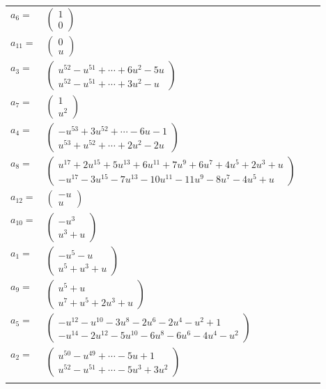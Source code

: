 \documentclass[1p]{elsarticle_modified}
\theoremstyle{definition}
\begin{document}
\begin{tabular}{m{7pt} m{180pt} m{7pt} m{180pt} }
\flushright $a_{6}=$&$\begin{pmatrix}1\\0\end{pmatrix}$ \\
\flushright $a_{11}=$&$\begin{pmatrix}0\\u\end{pmatrix}$ \\
\flushright $a_{3}=$&$\begin{pmatrix}u^{52}- u^{51}+\cdots+6 u^2-5 u\\u^{52}- u^{51}+\cdots+3 u^2- u\end{pmatrix}$ \\
\flushright $a_{7}=$&$\begin{pmatrix}1\\u^2\end{pmatrix}$ \\
\flushright $a_{4}=$&$\begin{pmatrix}- u^{53}+3 u^{52}+\cdots-6 u-1\\u^{53}+u^{52}+\cdots+2 u^2-2 u\end{pmatrix}$ \\
\flushright $a_{8}=$&$\begin{pmatrix}u^{17}+2 u^{15}+5 u^{13}+6 u^{11}+7 u^9+6 u^7+4 u^5+2 u^3+u\\- u^{17}-3 u^{15}-7 u^{13}-10 u^{11}-11 u^9-8 u^7-4 u^5+u\end{pmatrix}$ \\
\flushright $a_{12}=$&$\begin{pmatrix}- u\\u\end{pmatrix}$ \\
\flushright $a_{10}=$&$\begin{pmatrix}- u^3\\u^3+u\end{pmatrix}$ \\
\flushright $a_{1}=$&$\begin{pmatrix}- u^5- u\\u^5+u^3+u\end{pmatrix}$ \\
\flushright $a_{9}=$&$\begin{pmatrix}u^5+u\\u^7+u^5+2 u^3+u\end{pmatrix}$ \\
\flushright $a_{5}=$&$\begin{pmatrix}- u^{12}- u^{10}-3 u^8-2 u^6-2 u^4- u^2+1\\- u^{14}-2 u^{12}-5 u^{10}-6 u^8-6 u^6-4 u^4- u^2\end{pmatrix}$ \\
\flushright $a_{2}=$&$\begin{pmatrix}u^{50}- u^{49}+\cdots-5 u+1\\u^{52}- u^{51}+\cdots-5 u^3+3 u^2\end{pmatrix}$\\&\end{tabular}
\end{document}
